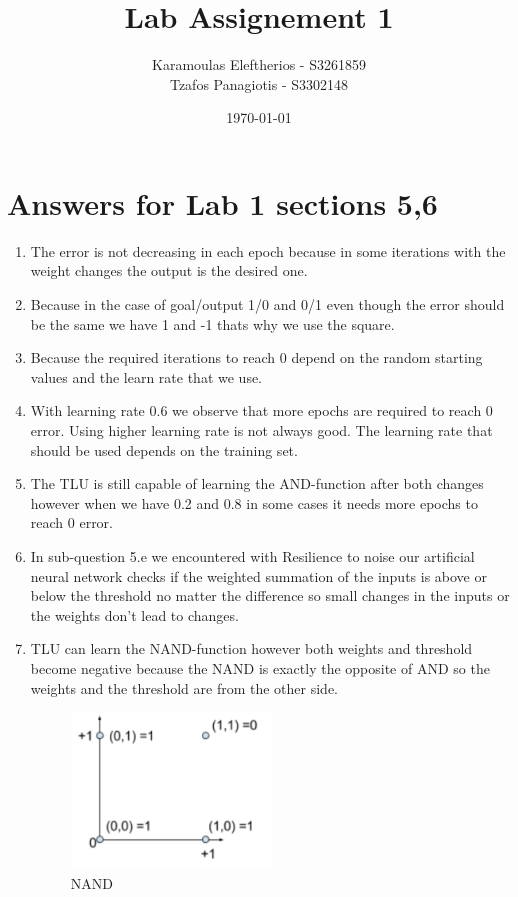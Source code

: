 \documentclass{article}
\title{Lab Assignement 1}
\date{\today}
\author{
	Karamoulas Eleftherios - S3261859\\
	Tzafos Panagiotis - S3302148\\
}
\begin{document}
\maketitle
\section{Answers for Lab 1 sections 5,6}
\begin{enumerate}[{5.a}]
  \item The error is not decreasing in each epoch because in some iterations with the weight changes the output is the desired one.
  \item Because in the case of goal/output 1/0 and 0/1 even though the error should be the same we have 1 and -1 thats why we use the square.
  \item Because the required iterations to reach 0 depend on the random starting values and the learn rate that we use.
  \item With learning rate 0.6 we observe that more epochs are required to reach 0 error. Using higher learning rate is not always good. The learning rate that should be used depends on the training set.
  \item The TLU is still capable of learning the AND-function after both changes however when we have 0.2 and 0.8 in some cases it needs more epochs to reach 0 error.
  \item In sub-question 5.e we encountered with Resilience to noise our artificial neural network checks if the weighted summation of the inputs is above or below the threshold no matter the difference so small changes in the inputs or the weights don't lead to changes.
  \item TLU can learn the NAND-function however both weights and threshold become negative because the NAND is exactly the opposite of AND so the weights and the threshold are from the other side.
\begin{figure}[!h]
    \centering
    \includegraphics[width=0.5\textwidth]{img/nand.png}
    \caption{NAND}
    \label{fig:diagram}
  \end{figure}
\end{enumerate}
\end{document}
